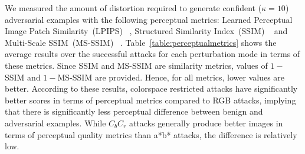 We measured the amount of distortion required to generate confident (\(\kappa = 10\)) adversarial examples with the following perceptual metrics: Learned Perceptual Image Patch Similarity~(LPIPS) ~\cite{zhang2018unreasonable}, Structured Similarity Index~(SSIM) ~\cite{wang2004image} and Multi-Scale SSIM~(MS-SSIM) ~\cite{wang2003multiscale}. Table~\ref{table:perceptualmetrics} shows the average results over the successful attacks for each perturbation mode in terms of these metrics. Since SSIM and MS-SSIM are similarity metrics, values of \(1-\)SSIM and \(1-\)MS-SSIM are provided. Hence, for all metrics, lower values are better. According to these results, colorspace restricted attacks have significantly better scores in terms of perceptual metrics compared to RGB attacks, implying that there is significantly less perceptual difference between benign and adversarial examples. While \(C_bC_r\) attacks generally produce better images in terms of perceptual quality metrics than a*b* attacks, the difference is relatively low.
